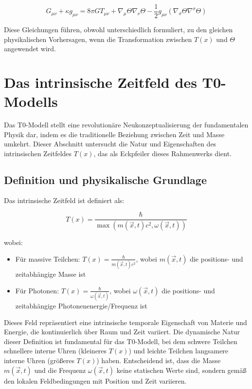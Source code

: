 \documentclass[12pt,a4paper]{article}
\newcommand{\Tfield}{T(x)}
\newcommand{\vecx}{\vec{x}}
\begin{document}
	\begin{equation}
		G_{\mu\nu} + \kappa g_{\mu\nu} = 8\pi G T_{\mu\nu} + \nabla_{\mu}\Theta\nabla_{\nu}\Theta - \frac{1}{2}g_{\mu\nu}(\nabla_{\sigma}\Theta\nabla^{\sigma}\Theta)
	\end{equation}
	
	Diese Gleichungen führen, obwohl unterschiedlich formuliert, zu den gleichen physikalischen Vorhersagen, wenn die Transformation zwischen \(\Tfield\) und \(\Theta\) angewendet wird.
	
	\section{Das intrinsische Zeitfeld des T0-Modells}
	\label{sec:t0_time_field}
	
	Das T0-Modell stellt eine revolutionäre Neukonzeptualisierung der fundamentalen Physik dar, indem es die traditionelle Beziehung zwischen Zeit und Masse umkehrt. Dieser Abschnitt untersucht die Natur und Eigenschaften des intrinsischen Zeitfeldes \(\Tfield\), das als Eckpfeiler dieses Rahmenwerks dient.
	
	\subsection{Definition und physikalische Grundlage}
	\label{subsec:time_field_definition}
	
	Das intrinsische Zeitfeld ist definiert als:
	
	\begin{equation}
		\Tfield = \frac{\hbar}{\max(m(\vecx,t)c^2, \omega(\vecx,t))}
	\end{equation}
	
	wobei:
	\begin{itemize}
		\item Für massive Teilchen: \(\Tfield = \frac{\hbar}{m(\vecx,t)c^2}\), wobei \(m(\vecx,t)\) die positions- und zeitabhängige Masse ist
		\item Für Photonen: \(\Tfield = \frac{\hbar}{\omega(\vecx,t)}\), wobei \(\omega(\vecx,t)\) die positions- und zeitabhängige Photonenenergie/Frequenz ist
	\end{itemize}
	
	Dieses Feld repräsentiert eine intrinsische temporale Eigenschaft von Materie und Energie, die kontinuierlich über Raum und Zeit variiert. Die dynamische Natur dieser Definition ist fundamental für das T0-Modell, bei dem schwere Teilchen schnellere interne Uhren (kleineres \(\Tfield\)) und leichte Teilchen langsamere interne Uhren (größeres \(\Tfield\)) haben. Entscheidend ist, dass die Masse \(m(\vecx,t)\) und die Frequenz \(\omega(\vecx,t)\) keine statischen Werte sind, sondern gemäß den lokalen Feldbedingungen mit Position und Zeit variieren.
	
\end{document}
